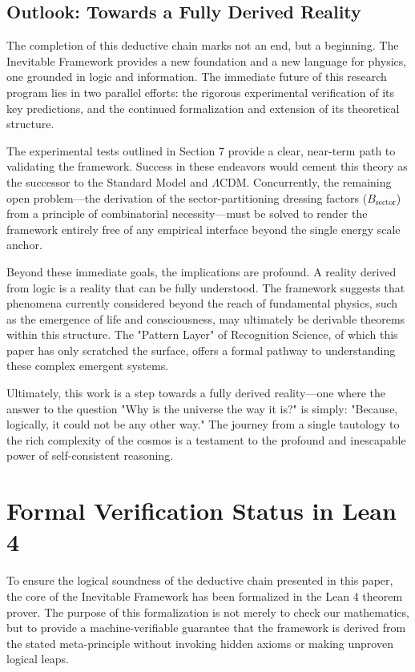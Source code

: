 \documentclass[11pt,a4paper]{article}
\begin{document}
\subsection{Outlook: Towards a Fully Derived Reality}
The completion of this deductive chain marks not an end, but a beginning. The Inevitable Framework provides a new foundation and a new language for physics, one grounded in logic and information. The immediate future of this research program lies in two parallel efforts: the rigorous experimental verification of its key predictions, and the continued formalization and extension of its theoretical structure.

The experimental tests outlined in Section 7 provide a clear, near-term path to validating the framework. Success in these endeavors would cement this theory as the successor to the Standard Model and \(\Lambda\)CDM. Concurrently, the remaining open problem—the derivation of the sector-partitioning dressing factors (\(B_{\text{sector}}\)) from a principle of combinatorial necessity—must be solved to render the framework entirely free of any empirical interface beyond the single energy scale anchor.

Beyond these immediate goals, the implications are profound. A reality derived from logic is a reality that can be fully understood. The framework suggests that phenomena currently considered beyond the reach of fundamental physics, such as the emergence of life and consciousness, may ultimately be derivable theorems within this structure. The "Pattern Layer" of Recognition Science, of which this paper has only scratched the surface, offers a formal pathway to understanding these complex emergent systems.

Ultimately, this work is a step towards a fully derived reality—one where the answer to the question "Why is the universe the way it is?" is simply: "Because, logically, it could not be any other way." The journey from a single tautology to the rich complexity of the cosmos is a testament to the profound and inescapable power of self-consistent reasoning.

\appendix
\section{Formal Verification Status in Lean 4}
To ensure the logical soundness of the deductive chain presented in this paper, the core of the Inevitable Framework has been formalized in the Lean 4 theorem prover. The purpose of this formalization is not merely to check our mathematics, but to provide a machine-verifiable guarantee that the framework is derived from the stated meta-principle without invoking hidden axioms or making unproven logical leaps.
\end{document}

